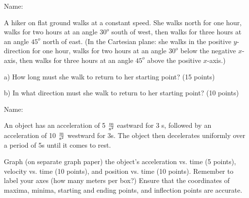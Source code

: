 \documentclass[12pt]{article}
\begin{document}
  \newpage

\begin{flushright}
    Name: \underline{\hspace{3in}}
  \end{flushright}

  \Large \centerline{}
  \normalsize
\rm

A hiker on flat ground walks at a constant speed. She walks north for one hour, walks for two hours at an angle $30^o$ south of west, then walks for three hours at an angle
$45^o$ north of east. (In the Cartesian plane: she walks in the positive $y$-direction for one hour, walks for two hours at an angle $30^o$ below the negative $x$-axis, then walks 
for three hours at an angle $45^o$ above the positive $x$-axis.)

\bigskip
  
\it

a) How long must she walk to return to her starting point? (15 points)

\vspace{3in}

b) In what direction must she walk to return to her starting point? (10 points)


\newpage






\begin{flushright}
    Name: \underline{\hspace{3in}}
    \end{flushright}
  
    \Large \centerline{}
    \normalsize
  \rm

  An object has an acceleration of 5 $\frac{\rm m}{\rm s^2}$ eastward for 3 s, followed by an acceleration of 10 $\frac{\rm m}{\rm s^2}$ westward for 3s. The object then 
  decelerates uniformly over a period of 5s until it comes to rest.

  \it \bigskip

  Graph (on separate graph paper) the object's acceleration vs. time (5 points), velocity vs. time (10 points), and position vs. time (10 points). Remember to label your axes (how many meters per box?)
  Ensure that the coordinates of maxima, minima, starting and ending points, and inflection points are accurate.
\end{document}
